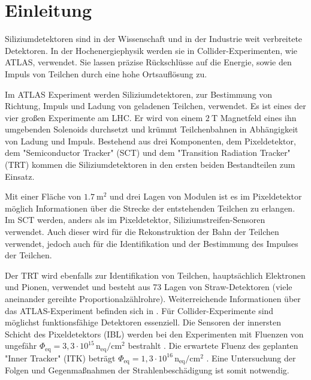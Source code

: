 \chapter{Einleitung}
Siliziumdetektoren sind in der Wissenschaft und in der Industrie weit verbreitete
Detektoren. In der Hochenergiephysik werden sie in Collider-Experimenten, wie ATLAS, verwendet.
Sie  lassen präzise Rückschlüsse auf die Energie, sowie den Impuls von Teilchen durch eine
hohe Ortsauflösung zu.


Im ATLAS Experiment werden Siliziumdetektoren, zur Bestimmung von Richtung, Impuls
und Ladung von geladenen Teilchen, verwendet. Es ist eines der vier großen Experimente am LHC.
Er wird von einem $\SI{2}{\tesla}$ Magnetfeld eines ihn umgebenden Solenoids
durchsetzt und krümmt Teilchenbahnen in Abhängigkeit von Ladung und Impuls.
Bestehend aus drei Komponenten, dem Pixeldetektor, dem "Semiconductor Tracker" (SCT) und dem "Transition Radiation Tracker" (TRT) kommen  die
Siliziumdetektoren in den ersten beiden Bestandteilen zum Einsatz.

Mit einer Fläche von $\SI{1.7}{\meter\squared}$ und drei Lagen von Modulen
ist es im Pixeldetektor möglich
Informationen über die Strecke der entstehenden Teilchen zu erlangen.
Im SCT werden, anders als im Pixeldetektor, Siliziumstreifen-Sensoren verwendet.
Auch dieser wird für
die Rekonstruktion der Bahn der Teilchen verwendet, jedoch auch für die Identifikation und der Bestimmung des Impulses der Teilchen.

Der TRT wird ebenfalls zur Identifikation von Teilchen, hauptsächlich Elektronen und Pionen, verwendet und besteht aus 73 Lagen
von Straw-Detektoren (viele aneinander gereihte Proportionalzählrohre).
Weiterreichende Informationen über das ATLAS-Experiment befinden sich in \cite{ATLAS}.
Für Collider-Experimente sind möglichst funktionsfähige Detektoren essenziell.
Die Sensoren der innersten Schicht des Pixeldetektors (IBL)
werden bei den Experimenten mit Fluenzen von ungefähr $\Phi_{\mathrm{eq}} =3,3\cdot 10^{15} \, \mathrm{n_{eq}/cm^2}$ bestrahlt \cite{Capeans:1291633}.
Die erwartete Fluenz des geplanten "Inner Tracker" (ITK) beträgt
$\Phi_{\mathrm{eq}} =1,3\cdot 10^{16} \, \mathrm{n_{eq}/cm^2}$ \cite{itk}. Eine Untersuchung
der Folgen und Gegenmaßnahmen der Strahlenbeschädigung ist somit notwendig.


